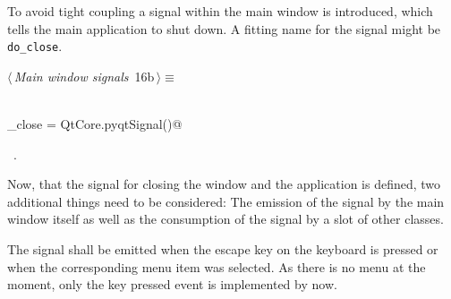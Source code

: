 \documentclass[
    a4paper,      %
    10pt,         %
    openright,    %
    notitlepage,  %
    parskip=half, %
]{scrreprt}       %
\theoremstyle{definition}                    %
\begin{document}
To avoid tight coupling a signal within the main window is introduced, which
tells the main application to shut down. A fitting name for the signal might be
\verb=do_close=.

\begin{flushleft} \small
\begin{minipage}{\linewidth}\label{scrap6}\raggedright\small
{} $\langle\,${\itshape Main window signals}\nobreak\ {\footnotesize {16b}}$\,\rangle\equiv$
\vspace{-1ex}
\begin{list}{}{} \item
\mbox{}\lstinline@@\\
\mbox{}\lstinline@do_close = QtCore.pyqtSignal()@\\
\mbox{}\lstinline@@{\NWsep}
\end{list}
\vspace{-1.5ex}
\footnotesize
\begin{list}{}{\setlength{\itemsep}{-\parsep}\setlength{\itemindent}{-\leftmargin}}
\item \NWtxtMacroRefIn\ .

\item{}
\end{list}
\end{minipage}\vspace{4ex}
\end{flushleft}
Now, that the signal for closing the window and the application is defined, two
additional things need to be considered: The emission of the signal by
the main window itself as well as the consumption of the signal by a slot of
other classes.

The signal shall be emitted when the escape key on the keyboard is pressed or
when the corresponding menu item was selected. As there is no menu at the
moment, only the key pressed event is implemented by now.
\end{document}
